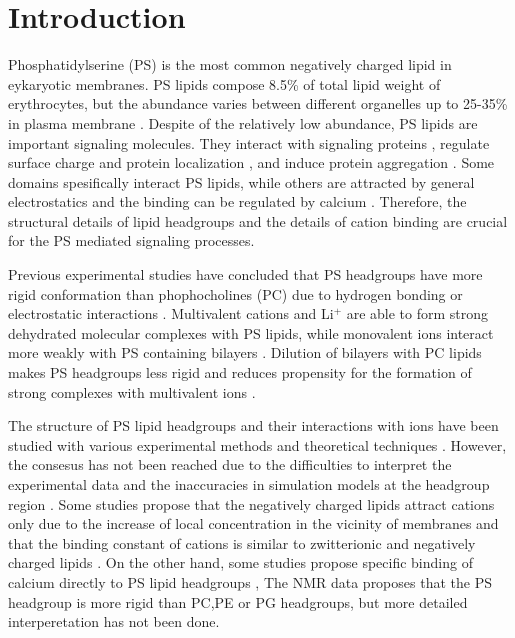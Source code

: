 \documentclass[aps,prl,superscriptaddress,twocolumn]{revtex4}
\begin{document}


\section{Introduction}
Phosphatidylserine (PS) is the most common negatively
charged lipid in eykaryotic membranes.
PS lipids compose 8.5\% of total lipid weight of erythrocytes,
but the abundance varies between different organelles up to
25-35\% in plasma membrane \cite{lemmon08,leventis10,li14}.
Despite of the relatively low abundance, PS lipids
are important signaling molecules. They interact with
signaling proteins \cite{leventis10}, regulate
surface charge and protein localization \cite{yeung08}, and
induce protein aggregation \cite{zhao04,gorbenko06}.
Some domains spesifically interact PS lipids,
while others are attracted by general electrostatics and the
binding can be regulated by calcium \cite{leventis10}.
Therefore, the structural details
of lipid headgroups and the details of cation binding
are crucial for the PS mediated signaling processes.

Previous experimental studies have concluded that
PS headgroups have more rigid conformation than
phophocholines (PC) due to hydrogen bonding or
electrostatic interactions \cite{browning80,buldt81}.
Multivalent cations and Li$^+$ are able to form strong
dehydrated molecular complexes with PS lipids,
while monovalent ions interact more weakly with PS
containing bilayers \cite{hauser77,kurland79,hauser83,hauser85,feigenson86,mattai89,roux90,roux91}.
Dilution of bilayers with PC lipids makes PS headgroups
less rigid and reduces propensity for the formation of
strong complexes with multivalent ions \cite{browning80,buldt81,roux90,roux91}.


The structure of PS lipid headgroups and their 
interactions with ions have been studied with
various experimental methods and theoretical techniques \cite{roux90,melcrova16,??}.
However, the consesus has not been reached 
due to the difficulties to interpret the experimental data \cite{??} and
the inaccuracies in simulation models at the
headgroup region \cite{botan15,catte16,ollila16}.
Some studies propose that the negatively charged lipids
attract cations only due to the increase of local concentration
in the vicinity of membranes and that the binding constant of cations is similar
to zwitterionic and negatively charged lipids \cite{seelig90,sinn06,??}.
On the other hand, some studies propose specific binding of calcium directly to PS lipid
headgroups \cite{vernier09,boettcher11,??},
The NMR data proposes that the PS headgroup is more rigid than PC,PE or PG
headgroups, but more detailed interperetation has not been done.
\end{document}
